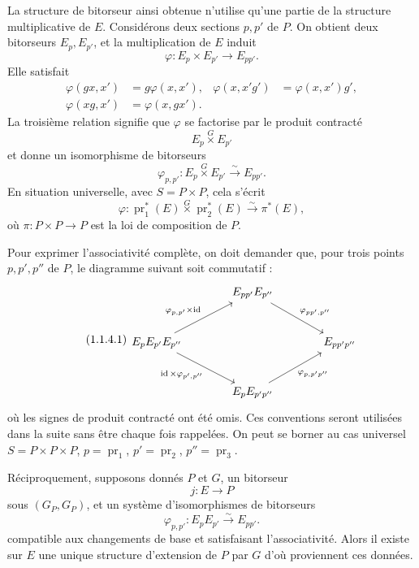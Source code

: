 \documentclass[11pt]{article}
\providecommand{\pr}{\operatorname{pr}}
\providecommand{\id}{\operatorname{id}}
\begin{document}
La structure de bitorseur ainsi obtenue n'utilise qu'une partie de la structure multiplicative de \(E\).  Considérons deux sections \(p,p'\) de \(P\).  On obtient deux bitorseurs \(E_p,E_{p'}\), et la multiplication de \(E\) induit
\[
  \varphi:E_p\times E_{p'}\longrightarrow E_{pp'}.
\]
Elle satisfait
\begin{equation}\tag{1.1.3.0}
\begin{aligned}
 \varphi(gx,x')&=g\varphi(x,x'),&
 \varphi(x,x'g')&=\varphi(x,x')g',\\
 \varphi(xg,x')&=\varphi(x,gx').
\end{aligned}
\end{equation}
La troisième relation signifie que \(\varphi\) se factorise par le produit contracté
\[
  E_p\overset{G}{\times}E_{p'}
\]
et donne un isomorphisme de bitorseurs
\begin{equation}\tag{1.1.3.1}
  \varphi_{p,p'}:E_p\overset{G}{\times}E_{p'}\xrightarrow{\sim}E_{pp'}.
\end{equation}
En situation universelle, avec \(S=P\times P\), cela s'écrit
\begin{equation}\tag{1.1.3.2}
  \varphi:\pr_1^*(E)\overset{G}{\times}\pr_2^*(E)
     \xrightarrow{\sim}\pi^*(E),
\end{equation}
où \(\pi:P\times P\to P\) est la loi de composition de \(P\).

Pour exprimer l'associativité complète, on doit demander que, pour trois points \(p,p',p''\) de \(P\), le diagramme suivant soit commutatif :
\begin{equation}\tag{1.1.4.1}
\begin{tikzcd}[column sep=large,row sep=large]
& E_{pp'}E_{p''}\arrow[dr,"\varphi_{pp',p''}"]&\\
E_pE_{p'}E_{p''}\arrow[ur,"\varphi_{p,p'}\times\id"]\arrow[dr,"\id\times\varphi_{p',p''}"']&&E_{pp'p''}\\
& E_pE_{p'p''}\arrow[ur,"\varphi_{p,p'p''}"']&
\end{tikzcd}
\end{equation}
où les signes de produit contracté ont été omis.  Ces conventions seront utilisées dans la suite sans être chaque fois rappelées.  On peut se borner au cas universel \(S=P\times P\times P\), \(p=\pr_1\), \(p'=\pr_2\), \(p''=\pr_3\).

Réciproquement, supposons donnés \(P\) et \(G\), un bitorseur
\begin{equation}\tag{1.1.5.1}
  j:E\longrightarrow P
\end{equation}
sous \((G_P,G_P)\), et un système d'isomorphismes de bitorseurs
\begin{equation}\tag{1.1.5.2}
  \varphi_{p,p'}:E_pE_{p'}\xrightarrow{\sim}E_{pp'}.
\end{equation}
compatible aux changements de base et satisfaisant l'associativité.  Alors il existe sur \(E\) une unique structure d'extension de \(P\) par \(G\) d'où proviennent ces données.
\end{document}
